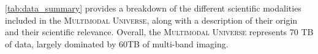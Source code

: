 \documentclass[dvipsnames,table]{article}
\newcommand\pile{\textsc{Multimodal Universe}\xspace}
\begin{document}
\autoref{tab:data_summary} provides a breakdown of the different scientific modalities included in the \pile, along with a description of their origin and their scientific relevance. Overall, the \pile represents 70 TB of data, largely dominated by 60TB of multi-band imaging.

\end{document}
